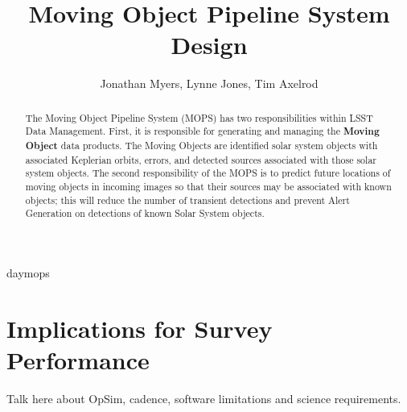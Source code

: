 \documentclass[12pt,preprint]{aastex}
\begin{document}
\title{Moving Object Pipeline System Design}

\author{Jonathan Myers, Lynne Jones, Tim Axelrod}

\begin{abstract}

The Moving Object Pipeline System (MOPS) has two responsibilities
within LSST Data Management.  First, it is responsible for generating
and managing the \textbf{Moving Object} data products.  The Moving
Objects are identified solar system objects with associated Keplerian
orbits, errors, and detected sources associated with those solar
system objects.  The second responsibility of the MOPS is to predict
future locations of moving objects in incoming images so that their
sources may be associated with known objects; this will reduce the
number of transient detections and prevent Alert Generation on
detections of known Solar System objects.  

\end{abstract}

\tableofcontents




 {daymops}



\section{Implications for Survey Performance}
Talk here about OpSim, cadence, software limitations and science requirements.









\end{document}
